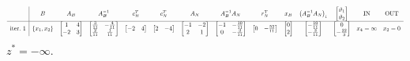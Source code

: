 \begin{equation*}
\scalemath{0.65}{
\begin{array}{ c|c c c c c c c c c c c c c }
 & B & A_{B} & A_{B}^{-1} & c_{B}^{T} & c_{N}^{T} & A_{N} & A_{B}^{-1} A_{N} & r_{N}^{T} & x_{B} & \left( A_{B}^{-1} A_{N}\right)_{i} & \begin{bmatrix}
\vartheta _{1}\\
\vartheta _{2}
\end{bmatrix} & \text{IN} & \text{OUT}\\
\hline
\text{iter.} \ 1 & \{x_{1} ,x_{2}\} & \begin{bmatrix}
1 & 4\\
-2 & 3
\end{bmatrix} & \begin{bmatrix}
\frac{3}{11} & -\frac{4}{11}\\
\frac{2}{11} & \frac{1}{11}
\end{bmatrix} & \begin{bmatrix}
-2 & 4
\end{bmatrix} & \begin{bmatrix}
2 & -4
\end{bmatrix} & \begin{bmatrix}
-1 & -2\\
2 & 1
\end{bmatrix} & \begin{bmatrix}
-1 & -\frac{10}{11}\\
0 & -\frac{3}{11}
\end{bmatrix} & \begin{bmatrix}
0 & -\frac{52}{11}
\end{bmatrix} & \begin{bmatrix}
0\\
2
\end{bmatrix} & \begin{bmatrix}
-\frac{10}{11}\\
-\frac{3}{11}
\end{bmatrix} & \begin{bmatrix}
0\\
-\frac{22}{3}
\end{bmatrix} & x_{4} =\infty  & x_{2} =0
\end{array}
}
\end{equation*}
$z^{*} =-\infty $.



\Es

